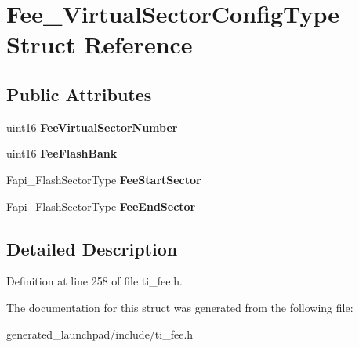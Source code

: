 \hypertarget{structFee__VirtualSectorConfigType}{}\section{Fee\+\_\+\+Virtual\+Sector\+Config\+Type Struct Reference}
\label{structFee__VirtualSectorConfigType}
\subsection*{Public Attributes}
\begin{DoxyCompactItemize}
\item 
\mbox{\label{structFee__VirtualSectorConfigType_a1d6c3a6629226472cc6e65cc0f516d07}} 
uint16 {\bfseries Fee\+Virtual\+Sector\+Number}
\item 
\mbox{\label{structFee__VirtualSectorConfigType_a2c9836f6fe627b0ffa72d61eea0b45cd}} 
uint16 {\bfseries Fee\+Flash\+Bank}
\item 
\mbox{\label{structFee__VirtualSectorConfigType_a17af0dee86dc5f197ab322f800b7e7e7}} 
Fapi\+\_\+\+Flash\+Sector\+Type {\bfseries Fee\+Start\+Sector}
\item 
\mbox{\label{structFee__VirtualSectorConfigType_a4e40aa15b89d8a21f09dffc0a420b5b2}} 
Fapi\+\_\+\+Flash\+Sector\+Type {\bfseries Fee\+End\+Sector}
\end{DoxyCompactItemize}


\subsection{Detailed Description}


Definition at line 258 of file ti\+\_\+fee.\+h.



The documentation for this struct was generated from the following file\+:\begin{DoxyCompactItemize}
\item 
generated\+\_\+launchpad/include/ti\+\_\+fee.\+h\end{DoxyCompactItemize}
